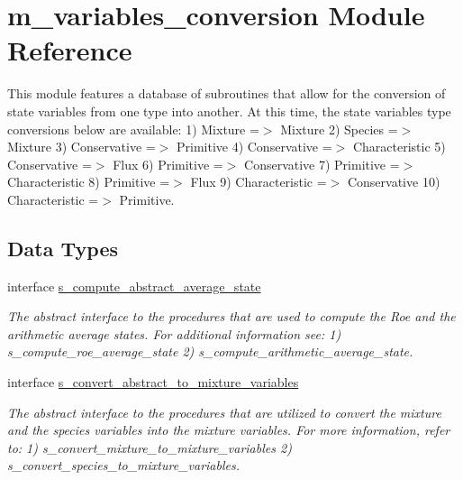 \hypertarget{namespacem__variables__conversion}{}\section{m\+\_\+variables\+\_\+conversion Module Reference}
\label{namespacem__variables__conversion}


This module features a database of subroutines that allow for the conversion of state variables from one type into another. At this time, the state variables type conversions below are available\+: 1) Mixture =$>$ Mixture 2) Species =$>$ Mixture 3) Conservative =$>$ Primitive 4) Conservative =$>$ Characteristic 5) Conservative =$>$ Flux 6) Primitive =$>$ Conservative 7) Primitive =$>$ Characteristic 8) Primitive =$>$ Flux 9) Characteristic =$>$ Conservative 10) Characteristic =$>$ Primitive.  


\subsection*{Data Types}
\begin{DoxyCompactItemize}
\item 
interface \hyperlink{interfacem__variables__conversion_1_1s__compute__abstract__average__state}{s\+\_\+compute\+\_\+abstract\+\_\+average\+\_\+state}
\begin{DoxyCompactList}\small\item\em The abstract interface to the procedures that are used to compute the Roe and the arithmetic average states. For additional information see\+: 1) s\+\_\+compute\+\_\+roe\+\_\+average\+\_\+state 2) s\+\_\+compute\+\_\+arithmetic\+\_\+average\+\_\+state. \end{DoxyCompactList}\item 
interface \hyperlink{interfacem__variables__conversion_1_1s__convert__abstract__to__mixture__variables}{s\+\_\+convert\+\_\+abstract\+\_\+to\+\_\+mixture\+\_\+variables}
\begin{DoxyCompactList}\small\item\em The abstract interface to the procedures that are utilized to convert the mixture and the species variables into the mixture variables. For more information, refer to\+: 1) s\+\_\+convert\+\_\+mixture\+\_\+to\+\_\+mixture\+\_\+variables 2) s\+\_\+convert\+\_\+species\+\_\+to\+\_\+mixture\+\_\+variables. \end{DoxyCompactList}\end{DoxyCompactItemize}
